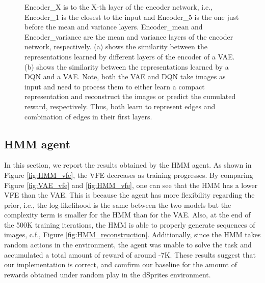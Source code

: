 \documentclass[twoside,11pt]{article}
\begin{document}
\begin{figure}[ht!]
\begin{subfigure}{.4\textwidth}
    \end{subfigure}
    \caption{Encoder\_X is to the X-th layer of the encoder network, i.e., Encoder\_1 is the closest to the input and Encoder\_5 is the one just before the mean and variance layers. Encoder\_mean and Encoder\_variance are the mean and variance layers of the encoder network, respectively. (a) shows the similarity between the representations learned by different layers of the encoder of a VAE.
        (b) shows the similarity between the representations learned by a DQN and a VAE. Note, both the VAE and DQN take images as input and need to process them to either learn a compact representation and reconstruct the images or predict the cumulated reward, respectively. Thus, both learn to represent edges and combination of edges in their first layers.}
    \label{fig:cka-vae}
\end{figure}

\subsection{HMM agent} \label{ssec:hmm_results}

In this section, we report the results obtained by the HMM agent. As shown in Figure \ref{fig:HMM_vfe}, the VFE decreases as training progresses. By comparing Figure \ref{fig:VAE_vfe} and \ref{fig:HMM_vfe}, one can see that the HMM has a lower VFE than the VAE. This is because the agent has more flexibility regarding the prior, i.e., the log-likelihood is the same between the two models but the complexity term is smaller for the HMM than for the VAE. Also, at the end of the 500K training iterations, the HMM is able to properly generate sequences of images, c.f., Figure \ref{fig:HMM_reconstruction}. Additionally, since the HMM takes random actions in the environment, the agent was unable to solve the task and accumulated a total amount of reward of around -7K. These results suggest that our implementation is correct, and comfirm our baseline for the amount of rewards obtained under random play in the dSprites environment.
\end{document}

